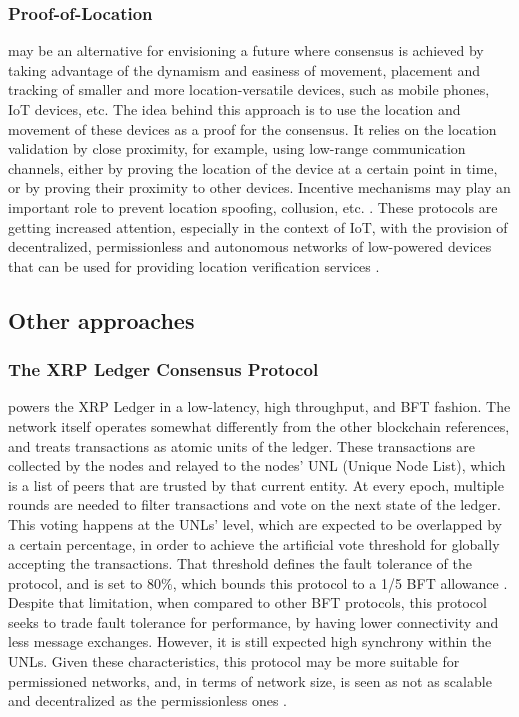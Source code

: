 \documentclass[journal]{IEEEtran}
\begin{document}
\subsubsection{Proof-of-Location} may be an alternative for envisioning a future where
consensus is achieved by taking advantage of the dynamism and easiness of movement, placement and 
tracking of smaller and more location-versatile devices, such as mobile phones, IoT devices, etc.
The idea behind this approach is to use the location and movement of these devices 
as a proof for the consensus. It relies on the location validation by close proximity, 
for example, using low-range communication channels, either by proving the location
of the device at a certain point in time, or by proving their proximity to other devices.
Incentive mechanisms may play an important role to prevent location spoofing, collusion, etc. \cite{natoli2019deconstructing}.
These protocols are getting increased attention, especially in the context of IoT, 
with the provision of decentralized, permissionless and autonomous networks of 
low-powered devices that can be used for providing location verification services \cite{9376868}.

\subsection{Other approaches}

\subsubsection{The XRP Ledger Consensus Protocol} powers the XRP Ledger in a
low-latency, high throughput, and  BFT fashion. The network itself operates somewhat
differently from the other blockchain references, and treats transactions as atomic units of 
the ledger. These transactions are collected by the nodes and relayed to the
nodes' UNL (Unique Node List), which is a list of peers that are trusted by that current
entity. At every epoch, multiple rounds are needed to filter transactions and vote 
on the next state of the ledger. This voting happens at the 
UNLs' level, which are expected to be overlapped by a certain percentage,
in order to achieve the artificial vote threshold for globally accepting the transactions.
That threshold defines the fault tolerance of the protocol, and is set to 80\%, which 
bounds this protocol to a 1/5 BFT allowance \cite{schwartz2014ripple, chase2018analysis}. 
Despite that limitation, when compared to other BFT protocols, this protocol seeks to trade 
fault tolerance for performance, by having lower connectivity and less message exchanges. 
However, it is still expected high synchrony within the UNLs. Given these characteristics, this protocol
may be more suitable for permissioned networks, and, in terms of network size,
is seen as not as scalable and decentralized as the permissionless ones \cite{survey-dist-consensus}.
\end{document}
